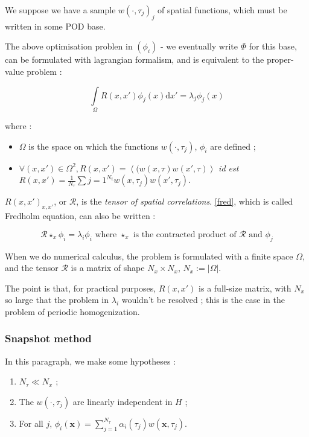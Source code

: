 We suppose we have a sample $w(\cdot,\tau_j)_j$ of spatial functions, which must be written in some POD base.

\par
The above optimisation problen in $(\phi_i)$ - we eventually write $\Phi$ for this base, %
can be formulated with lagrangian formalism, and is equivalent to the proper-value problem :

\begin{equation}\label{fred}
\int\limits_{\Omega}R(x,x')\phi_j (x)\text{d}x'=\lambda_j \phi_j (x)
\end{equation}

where :
\begin{itemize}
\item $\Omega$ is the space on which the functions $w(\cdot ,\tau_j)$, $\phi_i$ are defined ;
\item $\forall (x,x')\in\Omega^2 , R(x,x')=\left\langle(w(x,\tau)w(x',\tau)\right\rangle$ \emph{id est} $R(x,x')=\frac{1}{N_{\tau}}\sum\limits{j=1}^{N_t} w(x,\tau_j)w(x',\tau_j)$.
\end{itemize}

$R(x,x')_{x,x'}$, or $\mathcal{R}$, is the \emph{tensor of spatial correlations}. %
\ref{fred}, which is called Fredholm equation, can also be written :

\[\mathcal{R}\star_x\phi_i=\lambda_i\phi_i\text{ where $\star_x$ is the contracted product of $\mathcal{R}$ and $\phi_j$}\]

\etoile
When we do numerical calculus, the problem is formulated with a finite space $\Omega$, %
and the tensor $\mathcal{R}$ is a matrix of shape $N_x\times N_x$, $N_x :=|\Omega|$.

\par
The point is that, for practical purposes, $R(x,x')$ is a full-size matrix, with $N_x$ so large that the problem in $\lambda_i$ wouldn't be resolved ; %
this is the case in the problem of periodic homogenization.

\subsubsection{Snapshot method}

In this paragraph, we make some hypotheses :

\begin{enumerate}[label=(Snap \arabic*)]
\item\label{hs1} $N_{\tau}\ll N_x$ ;
\item The $w(\cdot , \tau_j)$ are linearly independent in $H$ ;
\item\label{hs3} For all $j$, $\phi_i(\mathbf{x})=\sum\limits_{j=1}^{N_{\tau}}\alpha_i(\tau_j) w(\mathbf{x},\tau_j)$.
\end{enumerate}

